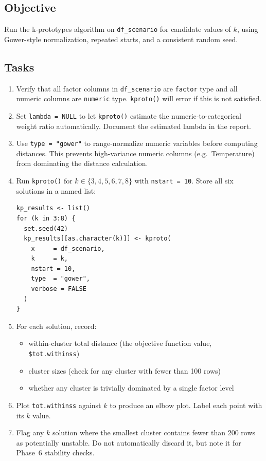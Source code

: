 \documentclass[11pt]{article}
\begin{document}
\subsection{Objective}

Run the k-prototypes algorithm on \texttt{df\_scenario} for candidate values of $k$, using Gower-style normalization, repeated starts, and a consistent random seed.

\subsection{Tasks}

\begin{enumerate}
  \item Verify that all factor columns in \texttt{df\_scenario} are \texttt{factor} type and all numeric columns are \texttt{numeric} type. \texttt{kproto()} will error if this is not satisfied.

  \item Set \texttt{lambda = NULL} to let \texttt{kproto()} estimate the numeric-to-categorical weight ratio automatically. Document the estimated lambda in the report.

  \item Use \texttt{type = "gower"} to range-normalize numeric variables before computing distances. This prevents high-variance numeric columns (e.g.\ Temperature) from dominating the distance calculation.

  \item Run \texttt{kproto()} for $k \in \{3, 4, 5, 6, 7, 8\}$ with \texttt{nstart = 10}. Store all six solutions in a named list:
  \begin{verbatim}
kp_results <- list()
for (k in 3:8) {
  set.seed(42)
  kp_results[[as.character(k)]] <- kproto(
    x     = df_scenario,
    k     = k,
    nstart = 10,
    type  = "gower",
    verbose = FALSE
  )
}
  \end{verbatim}

  \item For each solution, record:
  \begin{itemize}
    \item within-cluster total distance (the objective function value, \texttt{\$tot.withinss})
    \item cluster sizes (check for any cluster with fewer than 100 rows)
    \item whether any cluster is trivially dominated by a single factor level
  \end{itemize}

  \item Plot \texttt{tot.withinss} against $k$ to produce an elbow plot. Label each point with its $k$ value.

  \item Flag any $k$ solution where the smallest cluster contains fewer than 200 rows as potentially unstable. Do not automatically discard it, but note it for Phase~6 stability checks.
\end{enumerate}
\end{document}
